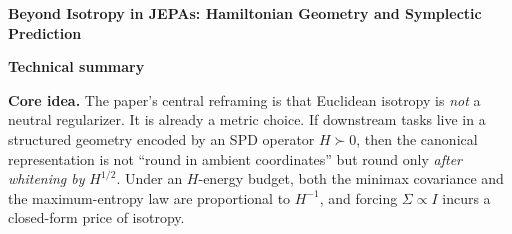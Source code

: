 \documentclass[10pt]{article}
\begin{document}
{\Large\bfseries\color{ink} Beyond Isotropy in JEPAs: Hamiltonian Geometry and Symplectic Prediction}\par
{\small\color{accent}\textbf{Technical summary}}\par\vspace{3pt}

\begin{keybox}
\textbf{Core idea.} The paper's central reframing is that Euclidean isotropy is \emph{not} a neutral regularizer. It is already a metric choice. If downstream tasks live in a structured geometry encoded by an SPD operator \(H\succ0\), then the canonical representation is not ``round in ambient coordinates'' but round only \emph{after whitening by} \(H^{1/2}\). Under an \(H\)-energy budget, both the minimax covariance and the maximum-entropy law are proportional to \(H^{-1}\), and forcing \(\Sigma\propto I\) incurs a closed-form price of isotropy.
\end{keybox}
\end{document}

